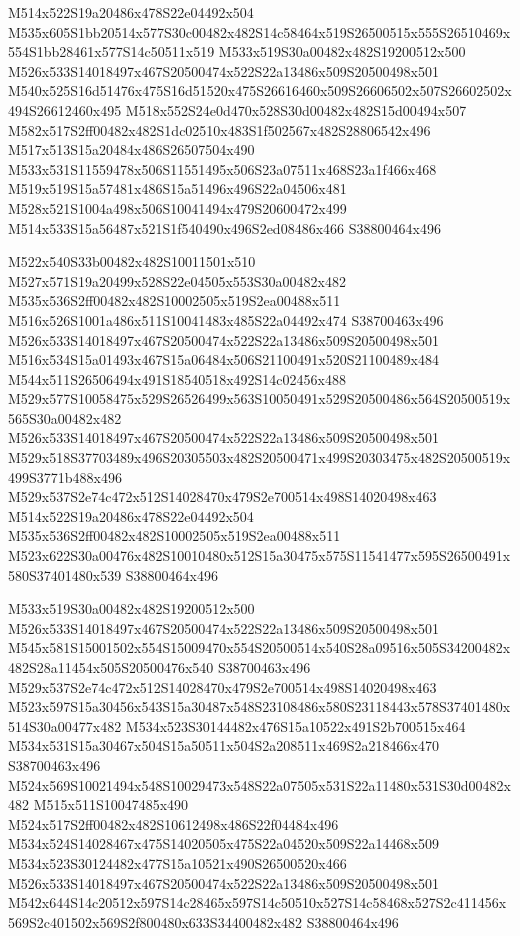 \documentclass{article}
\begin{document}
\begin{multicols}{2}
M514x522S19a20486x478S22e04492x504 M535x605S1bb20514x577S30c00482x482S14c58464x519S26500515x555S26510469x554S1bb28461x577S14c50511x519 M533x519S30a00482x482S19200512x500 M526x533S14018497x467S20500474x522S22a13486x509S20500498x501 M540x525S16d51476x475S16d51520x475S26616460x509S26606502x507S26602502x494S26612460x495 M518x552S24e0d470x528S30d00482x482S15d00494x507 M582x517S2ff00482x482S1dc02510x483S1f502567x482S28806542x496 M517x513S15a20484x486S26507504x490 M533x531S11559478x506S11551495x506S23a07511x468S23a1f466x468 M519x519S15a57481x486S15a51496x496S22a04506x481 M528x521S1004a498x506S10041494x479S20600472x499 M514x533S15a56487x521S1f540490x496S2ed08486x466 S38800464x496

M522x540S33b00482x482S10011501x510 M527x571S19a20499x528S22e04505x553S30a00482x482 M535x536S2ff00482x482S10002505x519S2ea00488x511 M516x526S1001a486x511S10041483x485S22a04492x474 S38700463x496 M526x533S14018497x467S20500474x522S22a13486x509S20500498x501 M516x534S15a01493x467S15a06484x506S21100491x520S21100489x484 M544x511S26506494x491S18540518x492S14c02456x488 M529x577S10058475x529S26526499x563S10050491x529S20500486x564S20500519x565S30a00482x482 M526x533S14018497x467S20500474x522S22a13486x509S20500498x501 M529x518S37703489x496S20305503x482S20500471x499S20303475x482S20500519x499S3771b488x496 M529x537S2e74c472x512S14028470x479S2e700514x498S14020498x463 M514x522S19a20486x478S22e04492x504 M535x536S2ff00482x482S10002505x519S2ea00488x511 M523x622S30a00476x482S10010480x512S15a30475x575S11541477x595S26500491x580S37401480x539 S38800464x496

M533x519S30a00482x482S19200512x500 M526x533S14018497x467S20500474x522S22a13486x509S20500498x501 M545x581S15001502x554S15009470x554S20500514x540S28a09516x505S34200482x482S28a11454x505S20500476x540 S38700463x496 M529x537S2e74c472x512S14028470x479S2e700514x498S14020498x463 M523x597S15a30456x543S15a30487x548S23108486x580S23118443x578S37401480x514S30a00477x482 M534x523S30144482x476S15a10522x491S2b700515x464 M534x531S15a30467x504S15a50511x504S2a208511x469S2a218466x470 S38700463x496 M524x569S10021494x548S10029473x548S22a07505x531S22a11480x531S30d00482x482 M515x511S10047485x490 M524x517S2ff00482x482S10612498x486S22f04484x496 M534x524S14028467x475S14020505x475S22a04520x509S22a14468x509 M534x523S30124482x477S15a10521x490S26500520x466 M526x533S14018497x467S20500474x522S22a13486x509S20500498x501 M542x644S14c20512x597S14c28465x597S14c50510x527S14c58468x527S2c411456x569S2c401502x569S2f800480x633S34400482x482 S38800464x496


\end{multicols}
\end{document}
